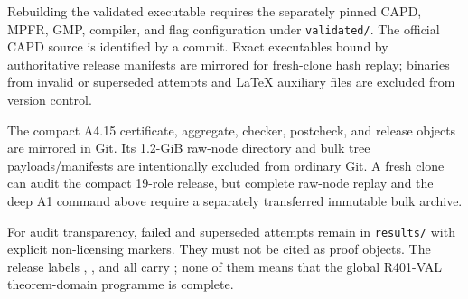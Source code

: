Rebuilding the validated executable requires the separately pinned CAPD,
MPFR, GMP, compiler, and flag configuration under \texttt{validated/}.  The
official CAPD source is identified by a commit.  Exact executables bound by
authoritative release manifests are mirrored for fresh-clone hash replay;
binaries from invalid or superseded attempts and LaTeX auxiliary files are
excluded from version control.

The compact A4.15 certificate, aggregate, checker, postcheck, and release
objects are mirrored in Git.  Its 1.2-GiB raw-node directory and bulk tree
payloads/manifests are intentionally excluded from ordinary Git.  A fresh
clone can audit the compact 19-role release, but complete raw-node replay and
the deep A1 command above require a separately transferred immutable bulk
archive.

For audit transparency, failed and superseded attempts remain in
\texttt{results/} with explicit non-licensing markers.  They must not be
cited as proof objects.  The release labels
,
, and
 all carry
; none of them means that the global R401-VAL
theorem-domain programme is complete.
